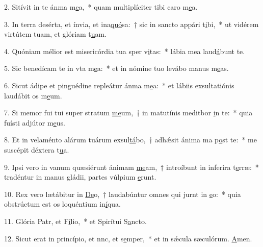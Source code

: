 2. Sitívit in te ánma m\uline{e}a,~* quam multiplíciter tibi caro m\uline{e}a.\par 
3. In terra desérta, et ínvia, et ina\uline{quó}sa:~† sic in sancto appári t\uline{i}bi,~* ut vidérem virtútem tuam, et glóriam t\uline{u}am.\par 
4. Quóniam mélior est misericórdia tua sper v\uline{i}tas:~* lábia mea laud\uline{á}bunt te.\par 
5. Sic benedícam te in vta m\uline{e}a:~* et in nómine tuo levábo manus m\uline{e}as.\par 
6. Sicut ádipe et pinguédine repleátur ánma m\uline{e}a:~* et lábiis exsultatiónis laudábit os m\uline{e}um.\par 
7. Si memor fui tui super stratum \uline{me}um,~† in matutínis meditbor \uline{i}n te:~* quia fuísti adjútor m\uline{e}us.\par 
8. Et in velaménto alárum tuárum exsul\uline{tá}bo,~† adhǽsit ánima ma p\uline{o}st te:~* me suscépit déxtera t\uline{u}a.\par 
9. Ipsi vero in vanum quæsiérunt ánimam \uline{me}am,~† introíbunt in inferira t\uline{e}rræ:~* tradéntur in manus gládii, partes vúlpium \uline{e}runt.\par 
10. Rex vero lætábitur in \uline{De}o,~† laudabúntur omnes qui jurnt in \uline{e}o:~* quia obstrúctum est os loquéntium in\uline{í}qua.\par 
11. Glória Patr, et F\uline{í}lio,~* et Spirítui S\uline{a}ncto.\par 
12. Sicut erat in princípio, et nnc, et s\uline{e}mper,~* et in sǽcula sæculórum. \uline{A}men.\par 
